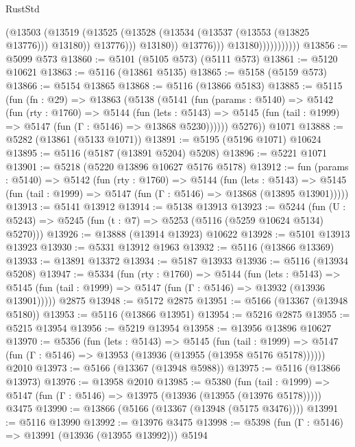 \begin{lexlean}{RustStd}
\begin{coremodule}
{\begin{coremodule}
{{{{{{{{{{{{{{{{{{{{{{{{{{{{{{{                                    (@13503
                                      (@13519
                                        (@13525
                                          (@13528 (@13534 (@13537 (@13553 (@13825 @13776))) @13180))
                                          @13776)))
                                    @13180))
                                @13776)))
                          @13180)))))))))))
@13856 := @5099 @573
@13860 := @5101 (@5105 @573) (@5111 @573)
@13861 := @5120 @10621
@13863 := @5116 (@13861 @5135)
@13865 := @5158 (@5159 @573)
@13866 := @5154 @13865
@13868 := @5116 (@13866 @5183)
@13885 := @5115
    (fun (fn : @29) =>
    @13863
      (@5138
        (@5141
          (fun (params : @5140) =>
          @5142
            (fun (rty : @1760) =>
            @5144
              (fun (lets : @5143) =>
              @5145 (fun (tail : @1999) => @5147 (fun (Γ : @5146) => @13868 @5230))))))
        @5276))
    @1071
@13888 := @5282 (@13861 (@5133 @1071))
@13891 := @5195 (@5196 @1071) @10624
@13895 := @5116 (@5187 (@13891 @5204) @5208)
@13896 := @5221 @1071
@13901 := @5218 (@5220 @13896 @10627 @5176 @5178)
@13912 := fun (params : @5140) =>
  @5142
    (fun (rty : @1760) =>
    @5144
      (fun (lets : @5143) =>
      @5145 (fun (tail : @1999) => @5147 (fun (Γ : @5146) => @13868 (@13895 @13901)))))
@13913 := @5141 @13912
@13914 := @5138 @13913
@13923 := @5244
    (fun (U : @5243) => @5245 (fun (t : @7) => @5253 (@5116 (@5259 @10624 @5134) @5270)))
@13926 := @13888 (@13914 @13923) @10622
@13928 := @5101 @13913 @13923
@13930 := @5331 @13912 @1963
@13932 := @5116 (@13866 @13369)
@13933 := @13891 @13372
@13934 := @5187 @13933
@13936 := @5116 (@13934 @5208)
@13947 := @5334
    (fun (rty : @1760) =>
    @5144
      (fun (lets : @5143) =>
      @5145 (fun (tail : @1999) => @5147 (fun (Γ : @5146) => @13932 (@13936 @13901)))))
    @2875
@13948 := @5172 @2875
@13951 := @5166 (@13367 (@13948 @5180))
@13953 := @5116 (@13866 @13951)
@13954 := @5216 @2875
@13955 := @5215 @13954
@13956 := @5219 @13954
@13958 := @13956 @13896 @10627
@13970 := @5356
    (fun (lets : @5143) =>
    @5145
      (fun (tail : @1999) =>
      @5147 (fun (Γ : @5146) => @13953 (@13936 (@13955 (@13958 @5176 @5178))))))
    @2010
@13973 := @5166 (@13367 (@13948 @5988))
@13975 := @5116 (@13866 @13973)
@13976 := @13958 @2010
@13985 := @5380
    (fun (tail : @1999) => @5147 (fun (Γ : @5146) => @13975 (@13936 (@13955 (@13976 @5178)))))
    @3475
@13990 := @13866 (@5166 (@13367 (@13948 (@5175 @3476))))
@13991 := @5116 @13990
@13992 := @13976 @3475
@13998 := @5398 (fun (Γ : @5146) => @13991 (@13936 (@13955 @13992))) @5194
}}}}}}}}}}}}}}}}}}}}}}}}}}}}}}}
\end{coremodule}}
\end{coremodule}
\end{lexlean}
